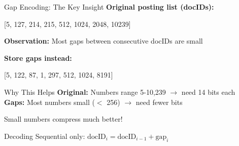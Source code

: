 \documentclass[aspectratio=169]{beamer}
\newif\ifanimated
\newcommand{\cpause}{\ifanimated\pause\fi}
\begin{document}
\begin{frame}[shrink=10]{Gap Encoding: The Key Insight}
\textbf{Original posting list (docIDs):}
\begin{center}
[5, 127, 214, 215, 512, 1024, 2048, 10239]
\end{center}

\vspace{0.5em}

\textbf{Observation:} Most gaps between consecutive docIDs are small

\vspace{0.5em}

\textbf{Store gaps instead:}
\begin{center}
[5, 122, 87, 1, 297, 512, 1024, 8191]
\end{center}

\vspace{1em}

\begin{block}{Why This Helps}
\textbf{Original:} Numbers range 5-10,239 $\rightarrow$ need 14 bits each \\
\textbf{Gaps:} Most numbers small ($<$ 256) $\rightarrow$ need fewer bits

\vspace{0.5em}

Small numbers compress much better!
\end{block}
\cpause

\vspace{1em}

\begin{alertblock}{Decoding}
Sequential only: $\text{docID}_i = \text{docID}_{i-1} + \text{gap}_i$
\end{alertblock}
\cpause
\end{frame}
\end{document}
